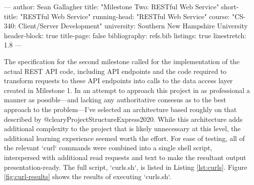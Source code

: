 ---
author: Sean Gallagher
title: "Milestone Two: RESTful Web Service"
short-title: "RESTful Web Service"
running-head: "RESTful Web Service"
course: "CS-340: Client/Server Development"
university: Southern New Hampshire University
header-block: true
title-page: false
bibliography: refs.bib
listings: true
linestretch: 1.8
---

\vskip -12pt
The specification for the second milestone called for the implementation of the
actual REST API code, including API endpoints and the code required to transform
requests to these API endpoints into calls to the data access layer created in
Milestone 1. In an attempt to approach this project in as professional a manner
as possible---and lacking any authoritative consesus as to the best approach to
the problem---I've selected an architecture based roughly on that described by
@clearyProjectStructureExpress2020. While this architecture adds additional
complexity to the project that is likely unnecessary at this level, the
additional learning experience seemed worth the effort. For ease of
testing, all of the relevant `curl` commands were combined into a single shell
script, interspersed with additional read requests and text to make the
resultant output presentation-ready. The full script, `curls.sh`, is listed in
Listing \ref{lst:curls}. Figure \ref{fig:curl-results} shows the results of
executing `curls.sh`.


